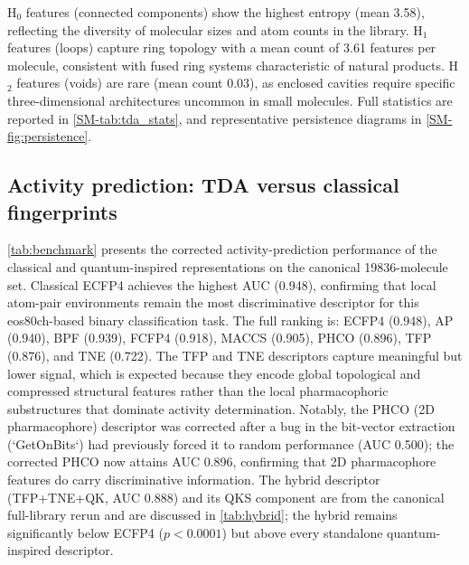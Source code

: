 \documentclass[11pt,a4paper]{article}
\begin{document}
H$_0$ features (connected components) show the highest entropy (mean \num{3.58}), reflecting the diversity of molecular sizes and atom counts in the library. H$_1$ features (loops) capture ring topology with a mean count of \num{3.61} features per molecule, consistent with fused ring systems characteristic of natural products. H$_2$ features (voids) are rare (mean count \num{0.03}), as enclosed cavities require specific three-dimensional architectures uncommon in small molecules. Full statistics are reported in \cref{SM-tab:tda_stats}, and representative persistence diagrams in \cref{SM-fig:persistence}.

\subsection{Activity prediction: TDA versus classical fingerprints}

\cref{tab:benchmark} presents the corrected activity-prediction performance of the classical and quantum-inspired representations on the canonical \num{19836}-molecule set. Classical ECFP4 achieves the highest AUC (\num{0.948}), confirming that local atom-pair environments remain the most discriminative descriptor for this eos80ch-based binary classification task. The full ranking is: ECFP4 (\num{0.948}), AP (\num{0.940}), BPF (\num{0.939}), FCFP4 (\num{0.918}), MACCS (\num{0.905}), PHCO (\num{0.896}), TFP (\num{0.876}), and TNE (\num{0.722}). The TFP and TNE descriptors capture meaningful but lower signal, which is expected because they encode global topological and compressed structural features rather than the local pharmacophoric substructures that dominate activity determination. Notably, the PHCO (2D pharmacophore) descriptor was corrected after a bug in the bit-vector extraction (`GetOnBits`) had previously forced it to random performance (AUC \num{0.500}); the corrected PHCO now attains AUC \num{0.896}, confirming that 2D pharmacophore features do carry discriminative information. The hybrid descriptor (TFP+TNE+QK, AUC \num{0.888}) and its QKS component are from the canonical full-library rerun and are discussed in \cref{tab:hybrid}; the hybrid remains significantly below ECFP4 ($p < \num{0.0001}$) but above every standalone quantum-inspired descriptor.
\end{document}
